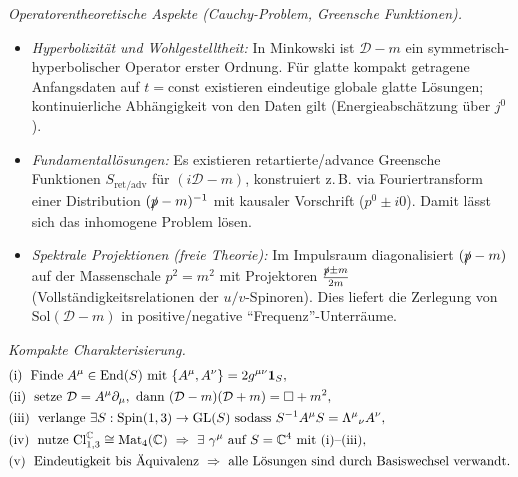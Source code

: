 \documentclass[10pt, letterpaper]{article}
\newcommand{\C}{\mathbb{C}}
\newcommand{\Cl}{\mathrm{Cl}}
\newcommand{\GL}{\mathrm{GL}}
\newcommand{\Mat}{\mathrm{Mat}}
\newcommand{\Spin}{\mathrm{Spin}}
\begin{document}
\emph{Operatorentheoretische Aspekte (Cauchy-Problem, Greensche Funktionen).}
\begin{itemize}\itemsep0.25ex
\item \emph{Hyperbolizität und Wohlgestelltheit:} In Minkowski ist $\mathcal D - m$ ein symmetrisch-hyperbolischer Operator erster Ordnung. Für glatte kompakt getragene Anfangsdaten auf $t=\mathrm{const}$ existieren eindeutige globale glatte Lösungen; kontinuierliche Abhängigkeit von den Daten gilt (Energieabschätzung über $j^0$).
\item \emph{Fundamentallösungen:} Es existieren retartierte/advance Greensche Funktionen $S_{\mathrm{ret/adv}}$ für $(i\mathcal D - m)$, konstruiert z.\,B. via Fouriertransform einer Distribution $(\slashed p - m)^{-1}$ mit kausaler Vorschrift ($p^0\pm i0$). Damit lässt sich das inhomogene Problem lösen.
\item \emph{Spektrale Projektionen (freie Theorie):} Im Impulsraum diagonalisiert $(\slashed p - m)$ auf der Massenschale $p^2=m^2$ mit Projektoren $\frac{\slashed p \pm m}{2m}$ (Vollständigkeitsrelationen der $u/v$-Spinoren). Dies liefert die Zerlegung von $\mathrm{Sol}(\mathcal D - m)$ in positive/negative “Frequenz”-Unterräume.
\end{itemize}

\emph{Kompakte Charakterisierung.}
\begin{align*}
&\text{(i) \;Finde}\; A^\mu\in\operatorname{End}(S)\ \text{mit}\ \{A^\mu,A^\nu\}=2g^{\mu\nu}\mathbf 1_S,\\
&\text{(ii) \;setze}\ \mathcal D = A^\mu\partial_\mu,\ \text{dann}\ (\mathcal D - m)(\mathcal D + m)=\Box+m^2,\\
&\text{(iii) \;verlange}\ \exists S:\Spin(1,3)\to\GL(S)\ \text{sodass}\ S^{-1}A^\mu S=\Lambda^\mu{}_\nu A^\nu,\\
&\text{(iv) \;nutze}\ \Cl_{1,3}^{\C}\cong \Mat_4(\C)\ \Rightarrow\ \exists\ \gamma^\mu\ \text{auf}\ S=\C^4\ \text{mit (i)--(iii)},\\
&\text{(v) \;Eindeutigkeit bis Äquivalenz}\ \Rightarrow\ \text{alle Lösungen sind durch Basiswechsel verwandt.}
\end{align*}
\end{document}
